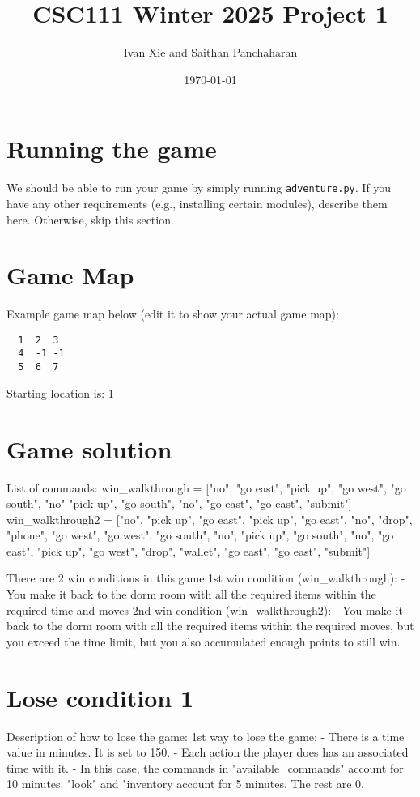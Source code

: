 \documentclass[11pt]{article}
\title{CSC111 Winter 2025 Project 1}
\author{Ivan Xie and Saithan Panchaharan}
\date{\today}
\begin{document}
\maketitle

\section*{Running the game}
We should be able to run your game by simply running \texttt{adventure.py}. If you have any other requirements (e.g., installing certain modules), describe them here. Otherwise, skip this section.

\section*{Game Map}
Example game map below (edit it to show your actual game map):

\begin{verbatim}
  1  2  3
  4  -1 -1
  5  6  7
\end{verbatim}

Starting location is: 1

\section*{Game solution}
List of commands: win_walkthrough = ["no", "go east", "pick up", "go west", "go south", "no"
                       "pick up", "go south", "no", "go east", "go east", "submit"]
                  win_walkthrough2 = ["no", "pick up", "go east", "pick up", "go east", "no", "drop",
                  "phone", "go west", "go west", "go south", "no", "pick up", "go south",
                  "no", "go east", "pick up", "go west", "drop", "wallet", "go east", "go east", "submit"]

There are 2 win conditions in this game
1st win condition (win_walkthrough):
    - You make it back to the dorm room with all the required items within the required time and moves
2nd win condition (win_walkthrough2):
    - You make it back to the dorm room with all the required items within the required moves, but you exceed the time limit, but you also accumulated enough points to still win.

\section*{Lose condition 1}
Description of how to lose the game:
1st way to lose the game:
    - There is a time value in minutes. It is set to 150.
    - Each action the player does has an associated time with it.
    - In this case, the commands in "available_commands" account for 10 minutes. "look" and "inventory account for 5 minutes. The rest are 0.
\end{document}
